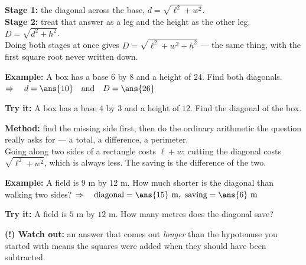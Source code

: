 \documentclass[12pt]{article}
\begin{document}

\begin{formulabox}
\textbf{Stage 1:} the diagonal across the base, $d = \sqrt{\ell^2 + w^2}$.\\[2pt]
\textbf{Stage 2:} treat that answer as a leg and the height as the other leg,
$D = \sqrt{d^2 + h^2}$.\\[3pt]
Doing both stages at once gives $D = \sqrt{\ell^2 + w^2 + h^2}$ --- the same thing, with the
first square root never written down.
\end{formulabox}

\begin{examplebox}
\textbf{Example:} \quad A box has a base $6$ by $8$ and a height of $24$. Find both diagonals.
$\Rightarrow\quad d = \ans{10} \quad \text{and} \quad D = \ans{26}$
\end{examplebox}

\begin{tryitbox}
\textbf{Try it:} \quad A box has a base $4$ by $3$ and a height of $12$. Find the diagonal of the
box.\\[2pt]
\end{tryitbox}


\begin{formulabox}
\textbf{Method:} find the missing side first, then do the ordinary arithmetic the question really
asks for --- a total, a difference, a perimeter.\\[3pt]
Going along two sides of a rectangle costs $\ell + w$; cutting the diagonal costs
$\sqrt{\ell^2 + w^2}$, which is always less. The saving is the difference of the two.
\end{formulabox}

\begin{examplebox}
\textbf{Example:} \quad A field is $9$ m by $12$ m. How much shorter is the diagonal than walking
two sides?
$\Rightarrow\quad \text{diagonal} = \ans{15} \text{ m},\ \text{saving} = \ans{6} \text{ m}$
\end{examplebox}

\begin{tryitbox}
\textbf{Try it:} \quad A field is $5$ m by $12$ m. How many metres does the diagonal save?\\[2pt]
\end{tryitbox}

\begin{watchoutbox}
\textbf{(!) Watch out:} an answer that comes out \textit{longer} than the hypotenuse you started
with means the squares were added when they should have been subtracted.
\end{watchoutbox}
\end{document}
